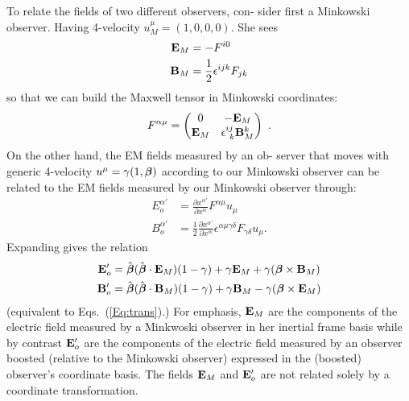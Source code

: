 To relate the fields of two different observers, con- sider first a
Minkowski observer. Having 4-velocity $u_M^\mu = (1, 0, 0, 0)$. She sees
\begin{align}
{\bf E}_M & = -F^{i0} \nonumber \\
{\bf B}_M & = \frac{1}{2}\epsilon^{ijk}F_{jk}
\end{align}
so that we can build the Maxwell tensor in Minkowski
coordinates:
\begin{equation}
F^{\alpha  \mu}=\begin{pmatrix}
0 & -{\bf E}_M \\
{\bf E}_M & \epsilon^{ij}_{\ k}{\bf B}_M^k
\end{pmatrix} \ . 
\end{equation}
On the other hand, the EM fields measured by an ob- server that moves
with generic 4-velocity $u^\mu = \gamma (1,{\boldsymbol \beta})$ according to our Minkowski
observer can be related to the EM fields measured by our Minkowski
observer through:
\begin{align}
E_o^{\alpha'} &= \frac{\partial x^{\alpha'}}{\partial x^{\alpha}}
F^{\alpha \mu} u_{\mu } \nonumber \\
B_o^{\alpha'} &= \frac{1}{2} \frac{\partial x^{\alpha'}}{\partial x^{\alpha}} \epsilon^{\alpha \mu \gamma \delta}F_{\gamma \delta} u_{\mu}.
\end{align}
Expanding gives the relation
\begin{align}
{\mathbf E}_o' &= \hat{\boldsymbol \beta} (\hat{\boldsymbol \beta} \cdot {\bf E}_M)(1-\gamma)+\gamma {\bf E}_M +\gamma({\boldsymbol \beta}
\times {\bf B}_M) \nonumber \\
{\mathbf B}_o' &= \hat{\boldsymbol \beta} (\hat{\boldsymbol \beta} \cdot {\bf B}_M)(1-\gamma)+\gamma {\bf B}_M -\gamma({\boldsymbol \beta}
\times {\bf E}_M) 
\end{align}
(equivalent to Eqs.\ (\ref{Eq:trans}).) For emphasis, ${\bf E}_M$ are the components of
the electric field measured by a Minkwoski
observer in her inertial frame basis while by contrast ${\bf E}_o'$ are the components
of the electric field measured by an observer boosted (relative to the
Minkowski observer) expressed in the (boosted) observer’s coordinate
basis. The fields ${\bf E}_M$ and ${\bf E}_o'$ are not related solely by a coordinate
transformation. 

